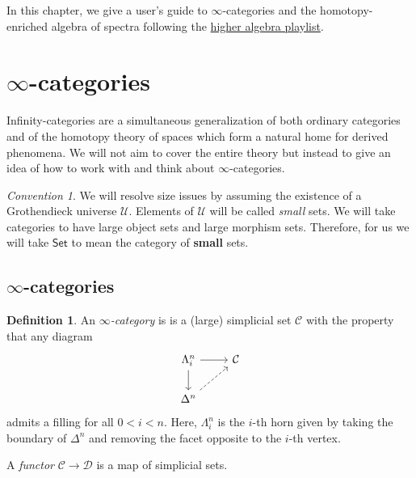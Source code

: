 \documentclass[10pt, oneside]{memoir}
\theoremstyle{definition}
\newtheorem{defn}[thm]{Definition}
\theoremstyle{remark}
\newtheorem{conv}[thm]{Convention}
\theoremstyle{plain}
\theoremstyle{definition}
\theoremstyle{remark}
\newcommand{\mc}[1]{\mathcal{#1}}
\newcommand{\ms}[1]{\mathsf{#1}}
\newcommand{\1}{\mathbf{1}}
\newcommand{\2}{\mathbf{2}}
\newcommand{\3}{\mathbf{3}}
\begin{document}
In this chapter, we give a user's guide to \(\infty \)-categories and the homotopy-enriched algebra of spectra following the \href{https://www.youtube.com/playlist?list=PLsmqTkj4MGTDenpj574aSvIRBROwCugoB}{higher algebra playlist}.

\section{\texorpdfstring{\(\infty \)-categories}{Infinity-categories}}%
\label{sec:Infinity-categories}

Infinity-categories are a simultaneous generalization of both ordinary categories and of the homotopy theory of spaces which form a natural home for derived phenomena. We will not aim to cover the entire theory but instead to give an idea of how to work with and think about \(\infty \)-categories.

\begin{conv}
    We will resolve size issues by assuming the existence of a Grothendieck universe \(\mc{U} \). Elements of \(\mc{U} \) will be called \textit{small} sets. We will take categories to have large object sets and large morphism sets. Therefore, for us we will take \(\ms{Set} \) to mean the category of \textbf{small} sets.
\end{conv}

\subsection{\texorpdfstring{\(\infty \)-categories}{Infinity-categories}}%
\label{sub:infinity cats}

\begin{defn}
    An \textit{\(\infty \)-category} is is a (large) simplicial set \(\mc{C} \) with the property that any diagram
    \begin{equation*}
    \begin{tikzcd}
        \Lambda_i^n \ar{r} \ar{d} & \mc{C} \\
        \Delta^n \ar[dashrightarrow]{ur}
    \end{tikzcd}
    \end{equation*}
    admits a filling for all \(0 < i < n \). Here, \(\Lambda_i^n \) is the \(i \)-th horn given by taking the boundary of \(\Delta^n \) and removing the facet opposite to the \(i \)-th vertex.

    A \textit{functor} \(\mc{C} \to \mc{D} \) is a map of simplicial sets.
\end{defn}
\end{document}
